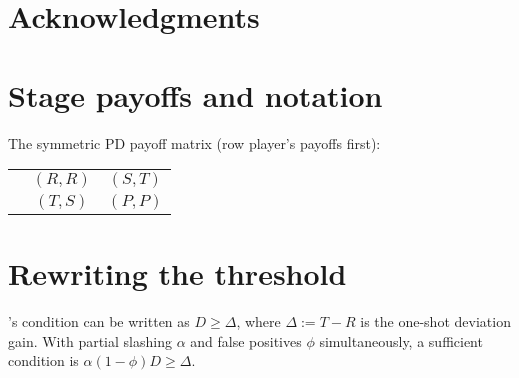 \documentclass[a4paper,11pt]{article}
\theoremstyle{definition}
\theoremstyle{plain}
\theoremstyle{remark}
\newcommand{\C}{\text{C}} %
\newcommand{\D}{\text{D}} %
\newcommand{\1}{\mathbf{1}}
\begin{document}
\section*{Acknowledgments}





\appendix
\section{Stage payoffs and notation}
The symmetric PD payoff matrix (row player's payoffs first):
\begin{center}
\begin{tabular}{c|cc}
 & \C & \D \\
\hline
\C & $(R,R)$ & $(S,T)$ \\
\D & $(T,S)$ & $(P,P)$ \\
\end{tabular}
\end{center}

\section{Rewriting the threshold}
's condition can be written as $D\ge \Delta$, where $\Delta:=T-R$ is the one-shot deviation gain.
With partial slashing $\alpha$ and false positives $\phi$ simultaneously, a sufficient condition is $\alpha(1-\phi)D \ge \Delta$.
\end{document}
